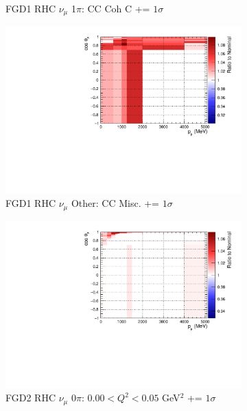 \begin{figure}
\begin{subfigure}{.32\textwidth}
  \caption{FGD1 RHC $\nu_{\mu}$ 1$\pi$: CC Coh C += $1\sigma$}
  \label{fig:sigvar_FGD1_NuMuBkg_CC1pi_in_AntiNu_Mode}
\end{subfigure}
\begin{subfigure}{.32\textwidth}
  \centering
  \includegraphics[width=0.85\linewidth]{figs/sig/FGD1_NuMuBkg_CCOther_in_AntiNu_Mode_CC_Misc_+1sig.pdf}
  \caption{FGD1 RHC $\nu_{\mu}$ Other: CC Misc. += $1\sigma$}
  \label{fig:sigvar_FGD1_NuMuBkg_CCOther_in_AntiNu_Mode}
\end{subfigure}
\begin{subfigure}{.32\textwidth}
  \centering
  \includegraphics[width=0.85\linewidth]{figs/sig/FGD2_NuMuBkg_CC0pi_in_AntiNu_Mode_Q2_norm_0_+1sig.pdf}
  \caption{FGD2 RHC $\nu_{\mu}$ 0$\pi$: $0.00 < Q^2 < 0.05$ GeV$^2$ += $1\sigma$}
  \label{fig:sigvar_FGD2_NuMuBkg_CC0pi_in_AntiNu_Mode}
\end{subfigure}
\begin{subfigure}{.32\textwidth}
  \centering

\end{subfigure}
\end{figure}
